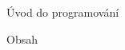\nopagenumbers

\tit Úvod do programování
\newpage

\nonum\notoc\sec Obsah
\maketoc
\newpage

\pagenumbers
